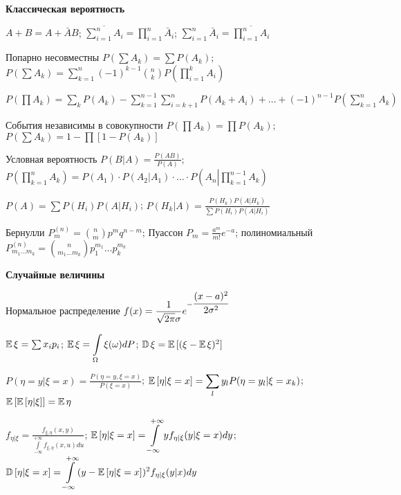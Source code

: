 \begin{center}
    \textbf{Классическая вероятность}
\end{center}

$A + B = A + \bar{A}B$;
$\displaystyle \overline{\sum_{i=1}^{n}A_i} = \prod_{i=1}^{n}\bar{A}_i$;
$\displaystyle \sum_{i=1}^{n}\bar{A}_i = \overline{\prod_{i=1}^{n}A_i}$

Попарно несовместны $P(\sum{A_k}) = \sum{P(A_k)}$;
$P(\sum A_k) = \sum_{k=1}^n (-1)^{k-1}\binom{n}{k}P(\prod_{i=1}^k A_i)$

$P(\prod A_k) = \sum_k P(A_k) - \sum_{k=1}^{n-1}\sum_{i=k+1}^n P(A_k + A_i) +\ldots + (-1)^{n-1}P(\sum_{k=1}^n A_k)$

События независимы в совокупности
$P(\prod A_k) = \prod{P(A_k)}$;
$P(\sum{A_k}) = 1-\prod[1-P(A_k)]$

Условная вероятность
$\displaystyle P(B|A) = \frac{P(AB)}{P(A)}$;
$\displaystyle P\left(\prod_{k=1}^{n}A_k\right) = P(A_1)\cdot P(A_2|A_1)\cdot\ldots\cdot P\left(A_n\left|\right.\prod_{k=1}^{n-1}A_k\right)$

$P(A) = \sum P(H_i)P(A|H_i)$;
$\displaystyle P(H_k|A) = \frac{P(H_k)P(A|H_k)}{\sum P(H_i)P(A|H_i)}$

Бернулли
$P^{(n)}_m = \binom{n}{m}p^mq^{n-m}$;
Пуассон
$\displaystyle P_m = \frac{a^m}{m!}e^{-a}$;
полиномиальный
$P^{(n)}_{m_1\ldots m_k} = \binom{n}{m_1\ldots m_k}p_1^{m_1}\ldots p_k^{m_k}$


\begin{center}
    \textbf{Случайные величины}
\end{center}

Нормальное распределение
$\displaystyle f(x) = \frac{1}{\sqrt{2\pi}\sigma}e^{-\cfrac{(x-a)^2}{2\sigma^2}}$

$\operatorname{\mathbb{E}}{\xi} = \sum x_ip_i$;
$\displaystyle \operatorname{\mathbb{E}}{\xi} = \int\limits_\Omega\xi(\omega)dP$;
$\operatorname{\mathbb{D}}{\xi} = \operatorname{\mathbb{E}}{[(\xi - \operatorname{\mathbb{E}}{\xi})^2]}$

$\displaystyle P(\eta = y | \xi = x) = \frac{P(\eta = y, \xi = x)}{P(\xi = x)}$;
$\displaystyle \operatorname{\mathbb{E}}{[\eta | \xi=x]} = \sum_ly_lP(\eta=y_l|\xi=x_k)$;
$\operatorname{\mathbb{E}}{[\operatorname{\mathbb{E}}{[\eta|\xi]}]} = \operatorname{\mathbb{E}}{\eta}$

$\displaystyle f_{\eta|\xi} =
\frac{f_{\xi,\eta}(x,y)}{\int\limits_{-\infty}^{+\infty}f_{\xi,\eta}(x,u)du}$;
$\displaystyle \operatorname{\mathbb{E}}{[\eta | \xi=x]} =
\int\limits_{-\infty}^{+\infty}yf_{\eta|\xi}(y|\xi=x)dy$;
$\displaystyle \operatorname{\mathbb{D}}{[\eta|\xi=x]} =
\int\limits_{-\infty}^{+\infty}(y-\operatorname{\mathbb{E}}{[\eta|\xi=x]})^2f_{\eta|\xi}(y|x)dy$
